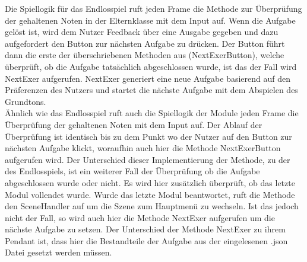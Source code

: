 Die Spiellogik für das Endlosspiel ruft jeden Frame die Methode zur Überprüfung der gehaltenen Noten in der Elternklasse mit dem Input auf. Wenn die Aufgabe gelöst ist, wird dem Nutzer Feedback über eine Ausgabe gegeben und dazu aufgefordert den Button zur nächsten Aufgabe zu drücken. Der Button führt dann die erste der überschriebenen Methoden aus (NextExerButton), welche überprüft, ob die Aufgabe tatsächlich abgeschlossen wurde, ist das der Fall wird NextExer aufgerufen. NextExer generiert eine neue Aufgabe basierend auf den Präferenzen des Nutzers und startet die nächste Aufgabe mit dem Abspielen des Grundtons. \\
Ähnlich wie das Endlosspiel ruft auch die Spiellogik der Module jeden Frame die Überprüfung der gehaltenen Noten mit dem Input auf. Der Ablauf der Überprüfung ist identisch bis zu dem Punkt wo der Nutzer auf den Button zur nächsten Aufgabe klickt, woraufhin auch hier die Methode NextExerButton aufgerufen wird. Der Unterschied dieser Implementierung der Methode, zu der des Endlosspiels, ist ein weiterer Fall der Überprüfung ob die Aufgabe abgeschlossen wurde oder nicht. Es wird hier zusätzlich überprüft, ob das letzte Modul vollendet wurde. Wurde das letzte Modul beantwortet, ruft die Methode den SceneHandler auf um die Szene zum Hauptmenü zu wechseln. Ist das jedoch nicht der Fall, so wird auch hier die Methode NextExer aufgerufen um die nächste Aufgabe zu setzen. Der Unterschied der Methode NextExer zu ihrem Pendant ist, dass hier die Bestandteile der Aufgabe aus der eingelesenen .json Datei gesetzt werden müssen. 

